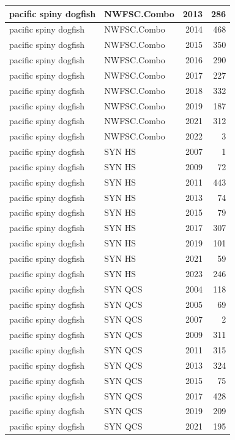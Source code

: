 \documentclass[
  letterpaper,
  DIV=11,
  numbers=noendperiod]{scrartcl}
\begin{document}
\begin{tabular}[t]{l|l|r|r}
\hline
pacific spiny dogfish & NWFSC.Combo & 2013 & 286\\
\hline
pacific spiny dogfish & NWFSC.Combo & 2014 & 468\\
\hline
pacific spiny dogfish & NWFSC.Combo & 2015 & 350\\
\hline
pacific spiny dogfish & NWFSC.Combo & 2016 & 290\\
\hline
pacific spiny dogfish & NWFSC.Combo & 2017 & 227\\
\hline
pacific spiny dogfish & NWFSC.Combo & 2018 & 332\\
\hline
pacific spiny dogfish & NWFSC.Combo & 2019 & 187\\
\hline
pacific spiny dogfish & NWFSC.Combo & 2021 & 312\\
\hline
pacific spiny dogfish & NWFSC.Combo & 2022 & 3\\
\hline
pacific spiny dogfish & SYN HS & 2007 & 1\\
\hline
pacific spiny dogfish & SYN HS & 2009 & 72\\
\hline
pacific spiny dogfish & SYN HS & 2011 & 443\\
\hline
pacific spiny dogfish & SYN HS & 2013 & 74\\
\hline
pacific spiny dogfish & SYN HS & 2015 & 79\\
\hline
pacific spiny dogfish & SYN HS & 2017 & 307\\
\hline
pacific spiny dogfish & SYN HS & 2019 & 101\\
\hline
pacific spiny dogfish & SYN HS & 2021 & 59\\
\hline
pacific spiny dogfish & SYN HS & 2023 & 246\\
\hline
pacific spiny dogfish & SYN QCS & 2004 & 118\\
\hline
pacific spiny dogfish & SYN QCS & 2005 & 69\\
\hline
pacific spiny dogfish & SYN QCS & 2007 & 2\\
\hline
pacific spiny dogfish & SYN QCS & 2009 & 311\\
\hline
pacific spiny dogfish & SYN QCS & 2011 & 315\\
\hline
pacific spiny dogfish & SYN QCS & 2013 & 324\\
\hline
pacific spiny dogfish & SYN QCS & 2015 & 75\\
\hline
pacific spiny dogfish & SYN QCS & 2017 & 428\\
\hline
pacific spiny dogfish & SYN QCS & 2019 & 209\\
\hline
pacific spiny dogfish & SYN QCS & 2021 & 195\\

\end{tabular}
\end{document}
